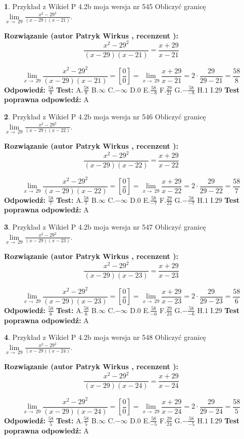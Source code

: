 \documentclass[12pt, a4paper]{article}
\theoremstyle{definition} %
\newtheorem{zad}{}
\newcommand{\zadStart}[1]{\begin{zad}#1\newline}
\newcommand{\zadStop}{\end{zad}}
\newcommand{\rozwStart}[2]{\noindent \textbf{Rozwiązanie (autor #1 , recenzent #2): }\newline}
\newcommand{\rozwStop}{\newline}
\newcommand{\odpStart}{\noindent \textbf{Odpowiedź:}\newline}
\newcommand{\odpStop}{\newline}
\newcommand{\testStart}{\noindent \textbf{Test:}\newline}
\newcommand{\testStop}{\newline}
\newcommand{\kluczStart}{\noindent \textbf{Test poprawna odpowiedź:}\newline}
\newcommand{\kluczStop}{\newline}
\begin{document}
\zadStart{Przykład z Wikieł P 4.2b moja wersja nr 545}
Obliczyć granicę $\lim\limits_{x\to\ 29}\frac{x^{2}-29^{2}}{(x-29)(x-21)}$.
\zadStop
\rozwStart{Patryk Wirkus}{}
$$\frac{x^{2}-29^{2}}{(x-29)(x-21)}=\frac{x+29}{x-21}$$

$$\lim\limits_{x\to\ 29}\frac{x^{2}-29^{2}}{(x-29)(x-21)}=[\frac{0}{0}]=\lim\limits_{x\to\ 29}\frac{x+29}{x-21}=2 \cdot \frac{29}{29-21} = \frac{58}{8}$$
\rozwStop
\odpStart
$\frac{58}{8}$
\odpStop
\testStart
A.$\frac{58}{8}$
B.$\infty$
C.$-\infty$
D.$0$
E.$\frac{58}{-8}$
F.$\frac{29}{21}$
G.$-\frac{58}{-8}$
H.$1$
I.$29$
\testStop
\kluczStart
A
\kluczStop



\zadStart{Przykład z Wikieł P 4.2b moja wersja nr 546}
Obliczyć granicę $\lim\limits_{x\to\ 29}\frac{x^{2}-29^{2}}{(x-29)(x-22)}$.
\zadStop
\rozwStart{Patryk Wirkus}{}
$$\frac{x^{2}-29^{2}}{(x-29)(x-22)}=\frac{x+29}{x-22}$$

$$\lim\limits_{x\to\ 29}\frac{x^{2}-29^{2}}{(x-29)(x-22)}=[\frac{0}{0}]=\lim\limits_{x\to\ 29}\frac{x+29}{x-22}=2 \cdot \frac{29}{29-22} = \frac{58}{7}$$
\rozwStop
\odpStart
$\frac{58}{7}$
\odpStop
\testStart
A.$\frac{58}{7}$
B.$\infty$
C.$-\infty$
D.$0$
E.$\frac{58}{-7}$
F.$\frac{29}{22}$
G.$-\frac{58}{-7}$
H.$1$
I.$29$
\testStop
\kluczStart
A
\kluczStop



\zadStart{Przykład z Wikieł P 4.2b moja wersja nr 547}
Obliczyć granicę $\lim\limits_{x\to\ 29}\frac{x^{2}-29^{2}}{(x-29)(x-23)}$.
\zadStop
\rozwStart{Patryk Wirkus}{}
$$\frac{x^{2}-29^{2}}{(x-29)(x-23)}=\frac{x+29}{x-23}$$

$$\lim\limits_{x\to\ 29}\frac{x^{2}-29^{2}}{(x-29)(x-23)}=[\frac{0}{0}]=\lim\limits_{x\to\ 29}\frac{x+29}{x-23}=2 \cdot \frac{29}{29-23} = \frac{58}{6}$$
\rozwStop
\odpStart
$\frac{58}{6}$
\odpStop
\testStart
A.$\frac{58}{6}$
B.$\infty$
C.$-\infty$
D.$0$
E.$\frac{58}{-6}$
F.$\frac{29}{23}$
G.$-\frac{58}{-6}$
H.$1$
I.$29$
\testStop
\kluczStart
A
\kluczStop



\zadStart{Przykład z Wikieł P 4.2b moja wersja nr 548}
Obliczyć granicę $\lim\limits_{x\to\ 29}\frac{x^{2}-29^{2}}{(x-29)(x-24)}$.
\zadStop
\rozwStart{Patryk Wirkus}{}
$$\frac{x^{2}-29^{2}}{(x-29)(x-24)}=\frac{x+29}{x-24}$$

$$\lim\limits_{x\to\ 29}\frac{x^{2}-29^{2}}{(x-29)(x-24)}=[\frac{0}{0}]=\lim\limits_{x\to\ 29}\frac{x+29}{x-24}=2 \cdot \frac{29}{29-24} = \frac{58}{5}$$
\rozwStop
\odpStart
$\frac{58}{5}$
\odpStop
\testStart
A.$\frac{58}{5}$
B.$\infty$
C.$-\infty$
D.$0$
E.$\frac{58}{-5}$
F.$\frac{29}{24}$
G.$-\frac{58}{-5}$
H.$1$
I.$29$
\testStop
\kluczStart
A
\kluczStop
\end{document}
